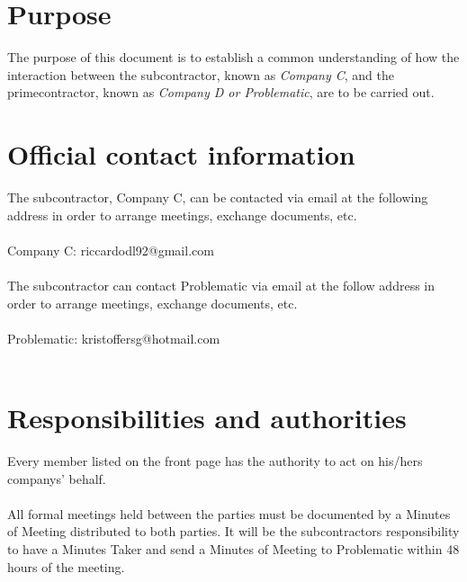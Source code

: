\chapter{Purpose}
The purpose of this document is to establish a common understanding of how the interaction between the subcontractor, known as \emph{Company C}, and the primecontractor, known as \emph{Company D or Problematic}, are to be carried out.

\chapter{Official contact information}
The subcontractor, Company C, can be contacted via email at the following address in order to arrange meetings, exchange documents, etc.\\\\

Company C: riccardodl92@gmail.com\\\\

\noindent The subcontractor can contact Problematic via email at the follow address in order to arrange meetings, exchange documents, etc.\\\\

Problematic: kristoffersg@hotmail.com\\\\


\chapter{Responsibilities and authorities}
Every member listed on the front page has the authority to act on his/hers companys' behalf.\\\\

\noindent All formal meetings held between the parties must be documented by a Minutes of Meeting distributed to both parties. 
It will be the subcontractors responsibility to have a Minutes Taker and send a Minutes of Meeting to Problematic within 48 hours of the meeting.


